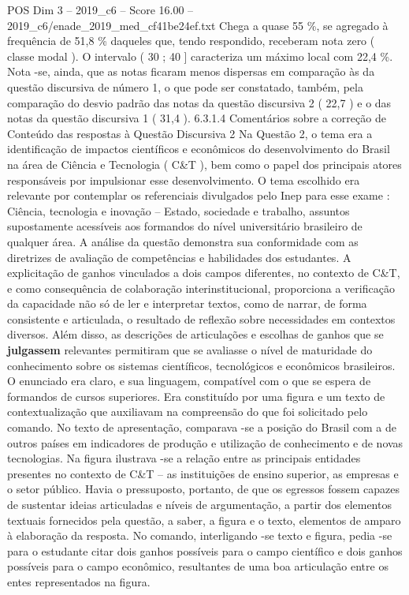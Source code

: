 \begin{textsample}{POS Dim 3 – 2019\_c6 – Score 16.00 – 2019\_c6/enade\_2019\_med\_cf41be24ef.txt}
Chega a quase 55 \%, se agregado à frequência de 51,8 \% daqueles que, tendo respondido, receberam nota zero ( classe modal ).
O intervalo ( 30 ; 40 ] caracteriza um máximo local com 22,4 \%.
Nota -se, ainda, que as notas ficaram menos dispersas em comparação às da questão discursiva de número 1, o que pode ser constatado, também, pela comparação do desvio padrão das notas da questão discursiva 2 ( 22,7 ) e o das notas da questão discursiva 1 ( 31,4 ). 6.3.1.4 Comentários sobre a correção de Conteúdo das respostas à Questão Discursiva 2 Na Questão 2, o tema era a identificação de impactos científicos e econômicos do desenvolvimento do Brasil na área de Ciência e Tecnologia ( C\&T ), bem como o papel dos principais atores responsáveis por impulsionar esse desenvolvimento.
O tema escolhido era relevante por contemplar os referenciais divulgados pelo Inep para esse exame : Ciência, tecnologia e inovação – Estado, sociedade e trabalho, assuntos supostamente acessíveis aos formandos do nível universitário brasileiro de qualquer área.
A análise da questão demonstra sua conformidade com as diretrizes de avaliação de competências e habilidades dos estudantes.
A explicitação de ganhos vinculados a dois campos diferentes, no contexto de C\&T, e como consequência de colaboração interinstitucional, proporciona a verificação da capacidade não só de ler e interpretar textos, como de narrar, de forma consistente e articulada, o resultado de reflexão sobre necessidades em contextos diversos.
Além disso, as descrições de articulações e escolhas de ganhos que se \textbf{julgassem} relevantes permitiram que se avaliasse o nível de maturidade do conhecimento sobre os sistemas científicos, tecnológicos e econômicos brasileiros.
O enunciado era claro, e sua linguagem, compatível com o que se espera de formandos de cursos superiores.
Era constituído por uma figura e um texto de contextualização que auxiliavam na compreensão do que foi solicitado pelo comando.
No texto de apresentação, comparava -se a posição do Brasil com a de outros países em indicadores de produção e utilização de conhecimento e de novas tecnologias.
Na figura ilustrava -se a relação entre as principais entidades presentes no contexto de C\&T – as instituições de ensino superior, as empresas e o setor público.
Havia o pressuposto, portanto, de que os egressos fossem capazes de sustentar ideias articuladas e níveis de argumentação, a partir dos elementos textuais fornecidos pela questão, a saber, a figura e o texto, elementos de amparo à elaboração da resposta.
No comando, interligando -se texto e figura, pedia -se para o estudante citar dois ganhos possíveis para o campo científico e dois ganhos possíveis para o campo econômico, resultantes de uma boa articulação entre os entes representados na figura.

\end{textsample}
